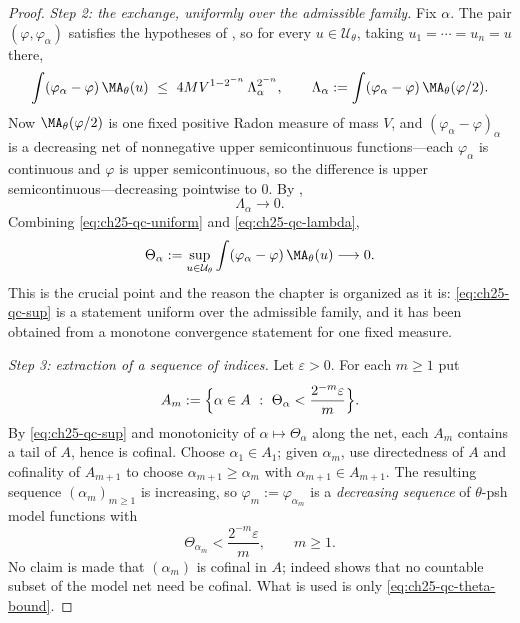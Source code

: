 \begin{proof}
\emph{Step 2: the exchange, uniformly over the admissible family.}  Fix
\(\alpha\).  The pair \((\varphi,\varphi_\alpha)\) satisfies the hypotheses
of , so for every
\(u\in\mathcal U_\theta\), taking \(u_1=\cdots=u_n=u\) there,
\begin{equation}
\label{eq:ch25-qc-uniform}
 \int(\varphi_\alpha-\varphi)\,\MA_\theta(u)
 \ \leq\ 4MV^{1-2^{-n}}\,\Lambda_\alpha^{2^{-n}},
 \qquad
 \Lambda_\alpha:=\int(\varphi_\alpha-\varphi)\,
   \MA_\theta(\varphi/2).
\end{equation}
Now \(\MA_\theta(\varphi/2)\) is one fixed positive Radon measure of mass
\(V\), and \((\varphi_\alpha-\varphi)_\alpha\) is a decreasing net of
nonnegative upper semicontinuous functions---each \(\varphi_\alpha\) is
continuous and \(\varphi\) is upper semicontinuous, so the difference is
upper semicontinuous---decreasing pointwise to \(0\).  By
,
\begin{equation}
\label{eq:ch25-qc-lambda}
 \Lambda_\alpha\longrightarrow0 .
\end{equation}
Combining \eqref{eq:ch25-qc-uniform} and \eqref{eq:ch25-qc-lambda},
\begin{equation}
\label{eq:ch25-qc-sup}
 \Theta_\alpha:=\sup_{u\in\mathcal U_\theta}
 \int(\varphi_\alpha-\varphi)\,\MA_\theta(u)\longrightarrow0 .
\end{equation}
This is the crucial point and the reason the chapter is organized as it is:
\eqref{eq:ch25-qc-sup} is a statement uniform over the admissible family, and
it has been obtained from a monotone convergence statement for one fixed
measure.

\emph{Step 3: extraction of a sequence of indices.}  Let \(\varepsilon>0\).
For each \(m\geq1\) put
\[
 A_m:=\Bigl\{\alpha\in A\ :\
   \Theta_\alpha<\frac{2^{-m}\varepsilon}{m}\Bigr\}.
\]
By \eqref{eq:ch25-qc-sup} and monotonicity of \(\alpha\mapsto\Theta_\alpha\)
along the net, each \(A_m\) contains a tail of \(A\), hence is cofinal.
Choose \(\alpha_1\in A_1\); given \(\alpha_{m}\), use directedness of \(A\)
and cofinality of \(A_{m+1}\) to choose
\(\alpha_{m+1}\geq\alpha_m\) with \(\alpha_{m+1}\in A_{m+1}\).  The resulting
sequence \((\alpha_m)_{m\geq1}\) is increasing, so
\(\varphi_m:=\varphi_{\alpha_m}\) is a \emph{decreasing sequence} of
\(\theta\)-psh model functions with
\begin{equation}
\label{eq:ch25-qc-theta-bound}
 \Theta_{\alpha_m}<\frac{2^{-m}\varepsilon}{m},\qquad m\geq1 .
\end{equation}
No claim is made that \((\alpha_m)\) is cofinal in \(A\); indeed
\Cref{ex:ch22-no-countable-cofinal} shows that no countable subset of the
model net need be cofinal.  What is used is only
\eqref{eq:ch25-qc-theta-bound}.


\end{proof}
